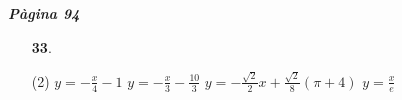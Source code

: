 \documentclass[a4paper, pdf, twoside]{book}
\begin{document}
\vspace{0.3cm}


{\textbf{\em Pàgina 94}} \hrulefill
\begin{enumerate}
\vspace{0.25cm}



 \item[\fontfamily{phv}\selectfont\color{blue}\textbf{33}. ] 
 \begin{tasks}[column-sep=1em, item-indent=1.3333em](2)
	 \task $y=-\frac {x}{4}-1$
	 \task $y=-\frac {x}{3}-\frac {10}{3}$
	 \task $y=-\frac {\sqrt {2}}{2}x+\frac {\sqrt {2}}{8}(\pi +4)$
	 \task $y=\frac {x}{e}$
\end{tasks}
 \end{enumerate}
\end{document}
